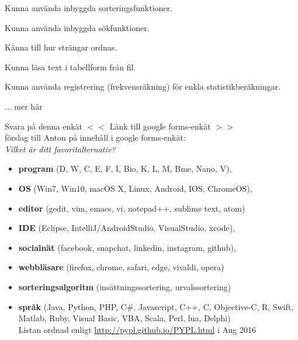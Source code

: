 

\Lab{\LabWeekTEN}

\begin{Goals}
\item Kunna använda inbyggda sorteringsfunktioner.
\item Kunna använda inbyggda sökfunktioner.
\item Känna till hur strängar ordnas.
\item Kunna läsa text i tabellform från fil.
\item Kunna använda registrering (frekvensräkning) för enkla statistikberäkningar.
\item ... \TODO mer här
\end{Goals}

\begin{Preparations}
\item {}
\item {}
\item \ReadTheLab
\item Svara på denna enkät $<<$ \TODO Länk till google forms-enkät $>>$  \\
\TODO förslag till Anton på innehåll i google forms-enkät:\\ \textit{Vilket är ditt favoritalternativ?}
\begin{itemize}[nolistsep,noitemsep]
\item \textbf{program} (D, W, C, E, F, I, Bio, K, L, M, Bme, Nano, V), 
\item \textbf{OS} (Win7, Win10, macOS X, Linux, Android, IOS, ChromeOS), 
\item \textbf{editor} (gedit, vim, emacs, vi, notepad++, sublime text, atom)
\item \textbf{IDE} (Eclipse, IntelliJ/AndroidStudio, VisualStudio, xcode), 
\item \textbf{socialnät} (facebook, snapchat, linkedin, instagram, github), 
\item \textbf{webbläsare} (firefox, chrome, safari, edge, vivaldi, opera)
\item \textbf{sorteringsalgoritm} (insättningssortering, urvalssortering)
\item \textbf{språk} (Java, Python, PHP, C\#, Javascript, C++, C, Objective-C, R, Swift, Matlab, Ruby, Visual Basic, VBA, Scala, Perl, lua, Delphi)  \\
Listan ordnad enligt \url{http://pypl.github.io/PYPL.html} i Aug 2016
\end{itemize}
\end{Preparations}


